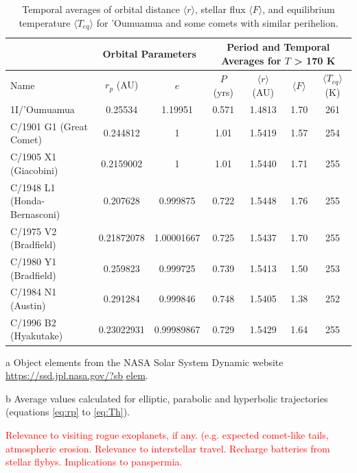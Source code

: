\documentclass[a4paper,fleqn,usenatbib]{mnras}
\newcommand{\fix}{\textcolor{red}}
\begin{document}

\begin{table}
\begin{threeparttable}
\centering
\caption{Temporal averages of orbital distance $\langle r \rangle$, stellar flux $\langle F \rangle$, and equilibrium temperature $\langle T_{eq} \rangle$ for 'Oumuamua and some comets with similar perihelion.}
\begin{tabular}{ l c c | c c c c }
 \hline
 \hline
 & \multicolumn{2}{c}{Orbital Parameters\tnote{a}} & \multicolumn{4}{c}{Period and Temporal Averages for $T$ > 170 K\tnote{b}} \\
 \hline
 Name & $r_p$ (AU) & $e$ & $P$ (yrs) &
 	$\langle r \rangle$ (AU) & $\langle F \rangle$ & $\langle T_{eq} \rangle$ (K) \\ 
 \hline
 1I/'Oumuamua & 0.25534 & 1.19951 & 0.571 & 1.4813 & 1.70 & 261 \\
 C/1901 G1 (Great Comet) & 0.244812 & 1 & 1.01 & 1.5419 & 1.57 & 254 \\
 C/1905 X1 (Giacobini) & 0.2159002 & 1 & 1.01 & 1.5440 & 1.71 & 255 \\
C/1948 L1 (Honda-Bernasconi) & 0.207628 & 0.999875 & 0.722 & 1.5448 & 1.76 & 255 \\
 C/1975 V2 (Bradfield) & 0.21872078 & 1.00001667 & 0.725 & 1.5437 & 1.70 & 255 \\
 C/1980 Y1 (Bradfield) & 0.259823 & 0.999725 & 0.739 & 1.5413 & 1.50 & 253 \\
 C/1984 N1 (Austin) & 0.291284 & 0.999846 & 0.748 & 1.5405 & 1.38 & 252 \\
 C/1996 B2 (Hyakutake) & 0.23022931	& 0.99989867 & 0.729 & 1.5429 & 1.64 & 255 \\
 \hline
 \hline
\end{tabular}
\label{tab:escape}
	\begin{tablenotes}
	\small
\item[a]{Object elements from the NASA Solar System Dynamic website \href{https://ssd.jpl.nasa.gov/?sb$\_$elem}{https://ssd.jpl.nasa.gov/?sb$\_$elem}.}
\item[b]{Average values calculated for elliptic, parabolic and hyperbolic trajectories (equations \ref{eq:rp} to \ref{eq:Th}).}
	\end{tablenotes}
\end{threeparttable}
\end{table}

\fix{Relevance to visiting rogue exoplanets, if any. (e.g. expected comet-like tails, atmospheric erosion. Relevance to interstellar travel. Recharge batteries from stellar flybys. Implications to panspermia.}
\end{document}
